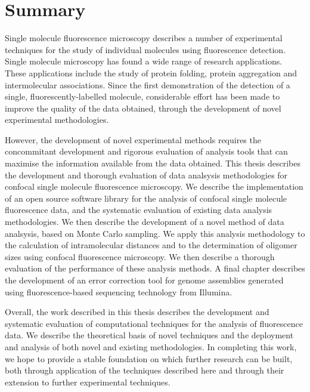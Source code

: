 \chapter*{Summary}
Single molecule fluorescence microscopy describes a number of experimental techniques for the study of individual molecules using fluorescence detection. Single molecule microscopy has found a wide range of research applications. These applications include the study of protein folding, protein aggregation and intermolecular associations. Since the first demonstration of the detection of a single, fluorescently-labelled molecule, considerable effort has been made to improve the quality of the data obtained, through the development of novel experimental methodologies.

However, the development of novel experimental methods requires the concommitant development and rigorous evaluation of analysis tools that can maximise the information available from the data obtained. This thesis describes the development and thorough evaluation of data analsysis methodologies for confocal single molecule fluorescence microscopy. We describe the implementation of an open source software library for the analysis of confocal single molecule fluorescence data, and the systematic evaluation of existing data analysis methodologies. We then describe the development of a novel method of data analsysis, based on Monte Carlo sampling. We apply this analysis methodology to the calculation of intramolecular distances and to the determination of oligomer sizes using confocal fluorescence microscopy. We then describe a thorough evaluation of the performance of these analysis methods. A final chapter describes the development of an error correction tool for genome assemblies generated using fluorescence-based sequencing technology from Illumina.

Overall, the work described in this thesis describes the development and systematic evaluation of computational techniques for the analysis of fluorescence data. We describe the theoretical basis of novel techniques and the deployment and analysis of both novel and existing methodologies. In completing this work, we hope to provide a stable foundation on which further research can be built, both through application of the techniques described here and through their extension to further experimental techniques.

